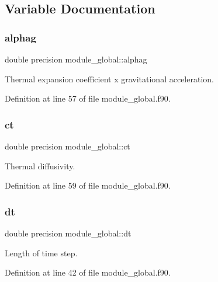 \subsection{Variable Documentation}
\mbox{\label{namespacemodule__global_adb7b5cd9635d90845f8b091ca401d382}} 
\subsubsection{\texorpdfstring{alphag}{alphag}}
{\footnotesize\ttfamily double precision module\+\_\+global\+::alphag}



Thermal expansion coefficient x gravitational acceleration. 



Definition at line 57 of file module\+\_\+global.\+f90.

\mbox{\label{namespacemodule__global_ab185cd164bb8dbff63e1fd6980be4f9d}} 
\subsubsection{\texorpdfstring{ct}{ct}}
{\footnotesize\ttfamily double precision module\+\_\+global\+::ct}



Thermal diffusivity. 



Definition at line 59 of file module\+\_\+global.\+f90.

\mbox{\label{namespacemodule__global_a7cd76bf7034f9b1c715f62694cc27471}} 
\subsubsection{\texorpdfstring{dt}{dt}}
{\footnotesize\ttfamily double precision module\+\_\+global\+::dt}



Length of time step. 



Definition at line 42 of file module\+\_\+global.\+f90.

